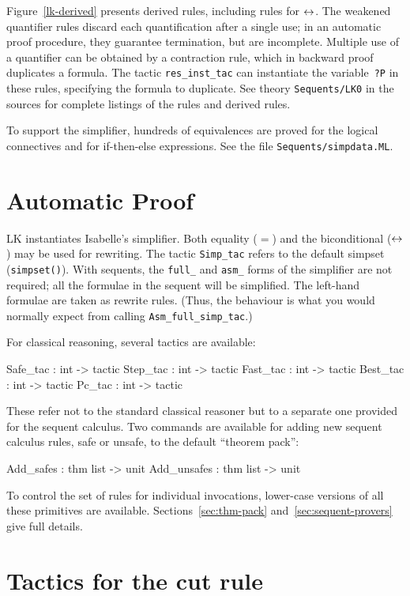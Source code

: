 Figure~\ref{lk-derived} presents derived rules, including rules for
$\leftrightarrow$.  The weakened quantifier rules discard each quantification after a
single use; in an automatic proof procedure, they guarantee termination,
but are incomplete.  Multiple use of a quantifier can be obtained by a
contraction rule, which in backward proof duplicates a formula.  The tactic
{\tt res_inst_tac} can instantiate the variable~{\tt?P} in these rules,
specifying the formula to duplicate.
See theory {\tt Sequents/LK0} in the sources for complete listings of
the rules and derived rules.

To support the simplifier, hundreds of equivalences are proved for
the logical connectives and for if-then-else expressions.  See the file
\texttt{Sequents/simpdata.ML}.

\section{Automatic Proof}

LK instantiates Isabelle's simplifier.  Both equality ($=$) and the
biconditional ($\leftrightarrow$) may be used for rewriting.  The tactic
\texttt{Simp_tac} refers to the default simpset (\texttt{simpset()}).  With
sequents, the \texttt{full_} and \texttt{asm_} forms of the simplifier are not
required; all the formulae{} in the sequent will be simplified.  The left-hand
formulae{} are taken as rewrite rules.  (Thus, the behaviour is what you would
normally expect from calling \texttt{Asm_full_simp_tac}.)

For classical reasoning, several tactics are available:
\begin{ttbox} 
Safe_tac : int -> tactic
Step_tac : int -> tactic
Fast_tac : int -> tactic
Best_tac : int -> tactic
Pc_tac   : int -> tactic
\end{ttbox}
These refer not to the standard classical reasoner but to a separate one
provided for the sequent calculus.  Two commands are available for adding new
sequent calculus rules, safe or unsafe, to the default ``theorem pack'':
\begin{ttbox} 
Add_safes   : thm list -> unit
Add_unsafes : thm list -> unit
\end{ttbox}
To control the set of rules for individual invocations, lower-case versions of
all these primitives are available.  Sections~\ref{sec:thm-pack}
and~\ref{sec:sequent-provers} give full details.


\section{Tactics for the cut rule}


